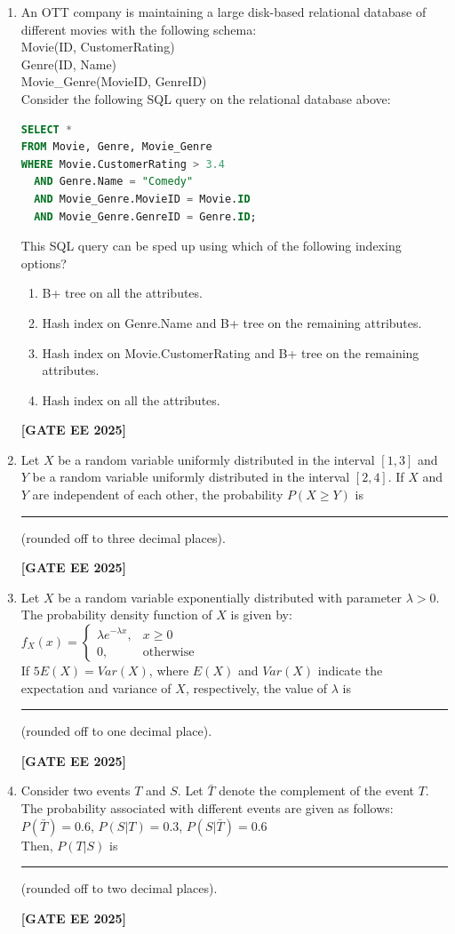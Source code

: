 \documentclass[journal]{IEEEtran}
\newcommand{\qfooter}{%
  \begin{flushright}\footnotesize\textbf{[GATE EE 2025]}\end{flushright}\vspace{1em}%
}
\begin{document}
\begin{enumerate}
\item An OTT company is maintaining a large disk-based relational database of different movies with the following schema:\\
Movie(ID, CustomerRating)\\
Genre(ID, Name)\\
Movie\_Genre(MovieID, GenreID)\\
Consider the following SQL query on the relational database above:
\begin{lstlisting}[language=SQL]
SELECT *
FROM Movie, Genre, Movie_Genre
WHERE Movie.CustomerRating > 3.4
  AND Genre.Name = "Comedy"
  AND Movie_Genre.MovieID = Movie.ID
  AND Movie_Genre.GenreID = Genre.ID;
\end{lstlisting}
This SQL query can be sped up using which of the following indexing options?
\begin{enumerate}
\item B+ tree on all the attributes.
\item Hash index on Genre.Name and B+ tree on the remaining attributes.
\item Hash index on Movie.CustomerRating and B+ tree on the remaining attributes.
\item Hash index on all the attributes.
\end{enumerate} 
\qfooter


\item Let $X$ be a random variable uniformly distributed in the interval $[1, 3]$ and $Y$ be a random variable uniformly distributed in the interval $[2, 4]$. If $X$ and $Y$ are independent of each other, the probability $P(X\geq Y)$ is \rule{7em}{0.07em} (rounded off to three decimal places).
\qfooter

\item Let $X$ be a random variable exponentially distributed with parameter $\lambda > 0$. The probability density function of $X$ is given by:\\
$f_X(x) = \begin{cases} \lambda e^{-\lambda x}, & x\geq 0\\ 0, & \text{otherwise} \end{cases}$\\
If $5E(X) = Var(X)$, where $E(X)$ and $Var(X)$ indicate the expectation and variance of $X$, respectively, the value of $\lambda$ is \rule{7em}{0.07em} (rounded off to one decimal place).
\qfooter

\item Consider two events $T$ and $S$. Let $\bar{T}$ denote the complement of the event $T$. The probability associated with different events are given as follows:\\
$P(\bar{T}) = 0.6$, $P(S|T) = 0.3$, $P(S|\bar{T}) = 0.6$\\
Then, $P(T|S)$ is \rule{6em}{0.07em} (rounded off to two decimal places).
\qfooter


\end{enumerate}
\end{document}
